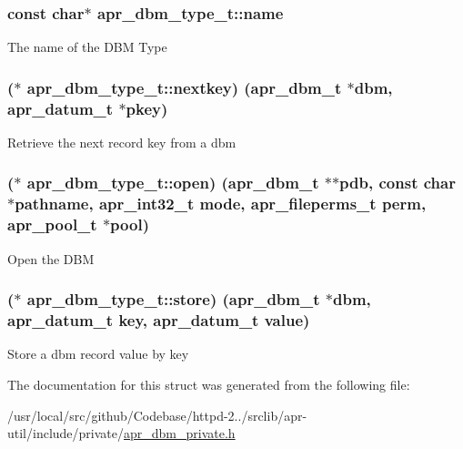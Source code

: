 \subsubsection[{\texorpdfstring{name}{name}}]{\setlength{\rightskip}{0pt plus 5cm}const char$\ast$ apr\+\_\+dbm\+\_\+type\+\_\+t\+::name}\hypertarget{structapr__dbm__type__t_af023b97eba22415785caf005fc5dcf64}{}\label{structapr__dbm__type__t_af023b97eba22415785caf005fc5dcf64}
The name of the D\+BM Type 
\subsubsection[{\texorpdfstring{nextkey}{nextkey}}]{($\ast$ apr\+\_\+dbm\+\_\+type\+\_\+t\+::nextkey) ({\bf apr\+\_\+dbm\+\_\+t} $\ast$dbm, {\bf apr\+\_\+datum\+\_\+t} $\ast${\bf pkey})}\hypertarget{structapr__dbm__type__t_a346ec9bb854be926c821fef6c70658c6}{}\label{structapr__dbm__type__t_a346ec9bb854be926c821fef6c70658c6}
Retrieve the next record key from a dbm 
\subsubsection[{\texorpdfstring{open}{open}}]{($\ast$ apr\+\_\+dbm\+\_\+type\+\_\+t\+::open) ({\bf apr\+\_\+dbm\+\_\+t} $\ast$$\ast$pdb, const char $\ast${\bf pathname}, {\bf apr\+\_\+int32\+\_\+t} {\bf mode}, {\bf apr\+\_\+fileperms\+\_\+t} {\bf perm}, {\bf apr\+\_\+pool\+\_\+t} $\ast${\bf pool})}\hypertarget{structapr__dbm__type__t_a823966386777dcdc76081cccb7c493e1}{}\label{structapr__dbm__type__t_a823966386777dcdc76081cccb7c493e1}
Open the D\+BM 
\subsubsection[{\texorpdfstring{store}{store}}]{($\ast$ apr\+\_\+dbm\+\_\+type\+\_\+t\+::store) ({\bf apr\+\_\+dbm\+\_\+t} $\ast$dbm, {\bf apr\+\_\+datum\+\_\+t} {\bf key}, {\bf apr\+\_\+datum\+\_\+t} {\bf value})}\hypertarget{structapr__dbm__type__t_a0c2e73a49901b9dcb80c302dd99a836b}{}\label{structapr__dbm__type__t_a0c2e73a49901b9dcb80c302dd99a836b}
Store a dbm record value by key 

The documentation for this struct was generated from the following file\+:\begin{DoxyCompactItemize}
\item 
/usr/local/src/github/\+Codebase/httpd-\/2../srclib/apr-\/util/include/private/\hyperlink{apr__dbm__private_8h}{apr\+\_\+dbm\+\_\+private.\+h}\end{DoxyCompactItemize}
